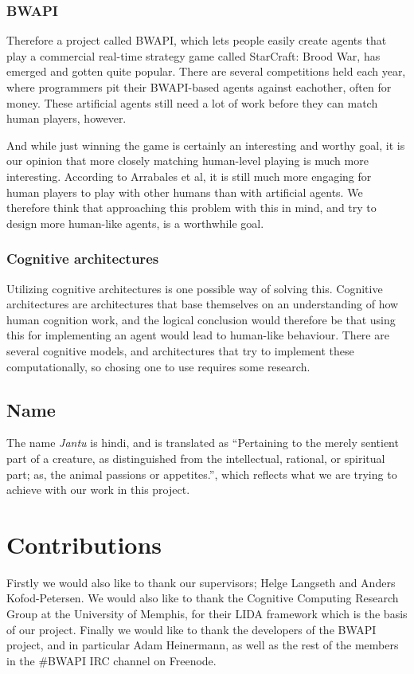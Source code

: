 \subsubsection{BWAPI}
Therefore a project called BWAPI, which lets people easily create agents that play a commercial real-time strategy game called StarCraft: Brood War, has emerged and gotten quite popular.\cite{bwapi} There are several competitions held each year, where programmers pit their BWAPI-based agents against eachother, often for money.\cite{sscait} These artificial agents still need a lot of work before they can match human players, however.\cite{eisbotvsfong}

And while just winning the game is certainly an interesting and worthy goal, it is our opinion that more closely matching human-level playing is much more interesting. According to Arrabales et al, it is still much more engaging for human players to play with other humans than with artificial agents.\cite{arrabales2009gamechars} We therefore think that approaching this problem with this in mind, and try to design more human-like agents, is a worthwhile goal.

\subsubsection{Cognitive architectures}
Utilizing cognitive architectures is one possible way of solving this. Cognitive architectures are architectures that base themselves on an understanding of how human cognition work, and the logical conclusion would therefore be that using this for implementing an agent would lead to human-like behaviour. There are several cognitive models, and architectures that try to implement these computationally, so chosing one to use requires some research.

\subsection{Name}
\label{sec:name}
The name {\em Jantu} is hindi, and is translated as ``Pertaining to the merely sentient part of a creature, as distinguished from the intellectual, rational, or spiritual part; as, the animal passions or appetites.'', which reflects what we are trying to achieve with our work in this project.\cite{hindijantu}

\section{Contributions}
\label{sec:contributions}
Firstly we would also like to thank our supervisors; Helge Langseth and Anders Kofod-Petersen. We would also like to thank the Cognitive Computing Research Group at the University of Memphis, for their LIDA framework which is the basis of our project. Finally we would like to thank the developers of the BWAPI project, and in particular Adam Heinermann, as well as the rest of the members in the \#BWAPI IRC channel on Freenode.

